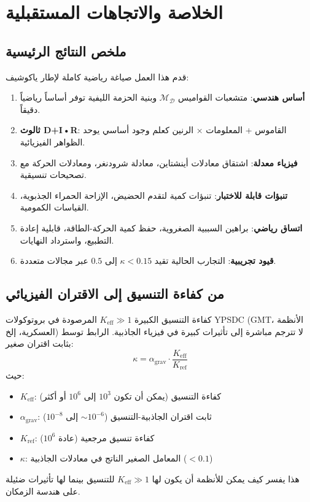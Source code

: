 \documentclass[11pt,a4paper]{article}
\begin{document}
	\section{الخلاصة والاتجاهات المستقبلية}
	\subsection{ملخص النتائج الرئيسية}
	
	قدم هذا العمل صياغة رياضية كاملة لإطار ياكوشيف:
	\begin{enumerate}
		\item \textbf{أساس هندسي}: متشعبات القواميس $\mathcal{M}_{\mathcal{D}}$ وبنية الحزمة الليفية توفر أساساً رياضياً دقيقاً.
		\item \textbf{ثالوث D+I•R}: القاموس + المعلومات × الرنين كعلم وجود أساسي يوحد الظواهر الفيزيائية.
		\item \textbf{فيزياء معدلة}: اشتقاق معادلات أينشتاين، معادلة شرودنغر، ومعادلات الحركة مع تصحيحات تنسيقية.
		\item \textbf{تنبؤات قابلة للاختبار}: تنبؤات كمية لتقدم الحضيض، الإزاحة الحمراء الجذبوية، القياسات الكمومية.
		\item \textbf{اتساق رياضي}: براهين السببية الصغروية، حفظ كمية الحركة-الطاقة، قابلية إعادة التطبيع، واسترداد النهايات.
		\item \textbf{قيود تجريبية}: التجارب الحالية تقيد $\kappa < 0.15$ إلى $0.5$ عبر مجالات متعددة.
	\end{enumerate}
	
	\subsection{من كفاءة التنسيق إلى الاقتران الفيزيائي}
	\label{subsec:keff-to-coupling}
	
	كفاءة التنسيق الكبيرة $K_{\mathrm{eff}} \gg 1$ المرصودة في بروتوكولات YPSDC (GMT، الأنظمة العسكرية، إلخ) لا تترجم مباشرة إلى تأثيرات كبيرة في فيزياء الجاذبية. الرابط توسط بثابت اقتران صغير:
	\begin{equation}
		\kappa = \alpha_{\text{grav}} \cdot \frac{K_{\mathrm{eff}}}{K_{\text{ref}}}
	\end{equation}
	حيث:
	\begin{itemize}
		\item $K_{\mathrm{eff}}$: كفاءة التنسيق (يمكن أن تكون $10^3$ إلى $10^6$ أو أكثر)
		\item $\alpha_{\text{grav}}$: ثابت اقتران الجاذبية-التنسيق ($\sim 10^{-6}$ إلى $10^{-8}$)
		\item $K_{\text{ref}}$: كفاءة تنسيق مرجعية (عادة $10^6$)
		\item $\kappa$: المعامل الصغير الناتج في معادلات الجاذبية ($< 0.1$)
	\end{itemize}
	هذا يفسر كيف يمكن للأنظمة أن يكون لها $K_{\mathrm{eff}} \gg 1$ للتنسيق بينما لها تأثيرات ضئيلة على هندسة الزمكان.
	
\end{document}
